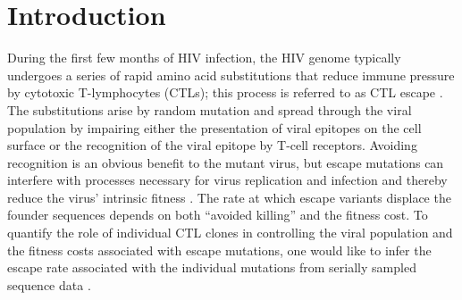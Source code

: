\documentclass{frontiers}
\begin{document}
\section{Introduction}
During the first few months of HIV infection, the HIV genome typically
undergoes a series of rapid amino acid substitutions that reduce immune
pressure by cytotoxic T-lymphocytes (CTLs); this process is referred to as CTL escape
\citep{Mcmichael:2009p31614}. The substitutions arise by random mutation and
spread through the viral population by impairing either the presentation of viral epitopes
on the cell surface or the recognition of the viral epitope by T-cell
receptors. Avoiding recognition is an obvious benefit to the mutant virus, but
escape mutations can interfere with processes necessary for virus replication and
infection and thereby reduce the virus' intrinsic fitness \citep{Fernandez:2005p44304,Li:2007p43266,ganusov_fitness_2011,seki_ctl_2012}. The rate at which escape
variants displace the founder sequences depends on both ``avoided killing''
and the fitness cost. To quantify the role of individual CTL clones in
controlling the viral population and the fitness costs associated with escape
mutations, one would like to infer the escape rate associated
with the individual mutations from serially sampled sequence data 
\citep{ganusov_fitness_2011,Asquith:2006p28003}.
\end{document}
